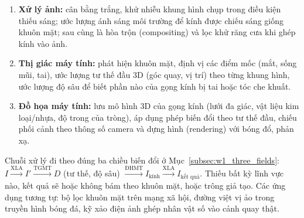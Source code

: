 \begin{enumerate}
    \item \textbf{Xử lý ảnh:} cân bằng trắng, khử nhiễu khung hình chụp trong điều kiện thiếu sáng; ước lượng ánh sáng môi trường để kính được chiếu sáng giống khuôn mặt; sau cùng là hòa trộn (compositing) và lọc khử răng cưa khi ghép kính vào ảnh.
    \item \textbf{Thị giác máy tính:} phát hiện khuôn mặt, định vị các điểm mốc (mắt, sống mũi, tai), ước lượng tư thế đầu 3D (góc quay, vị trí) theo từng khung hình, ước lượng độ sâu để biết phần nào của gọng kính bị tai hoặc tóc che khuất.
    \item \textbf{Đồ họa máy tính:} lưu mô hình 3D của gọng kính (lưới đa giác, vật liệu kim loại/nhựa, độ trong của tròng), áp dụng phép biến đổi theo tư thế đầu, chiếu phối cảnh theo thông số camera và dựng hình (rendering) với bóng đổ, phản xạ.
\end{enumerate}

Chuỗi xử lý đi theo đúng ba chiều biến đổi ở Mục~\ref{subsec:w1_three_fields}: $I \xrightarrow{\text{XLA}} I' \xrightarrow{\text{TGMT}} D$ (tư thế, độ sâu) $\xrightarrow{\text{ĐHMT}} I_{\text{kính}} \xrightarrow{\text{XLA}} I_{\text{kết quả}}$. Thiếu bất kỳ lĩnh vực nào, kết quả sẽ hoặc không bám theo khuôn mặt, hoặc trông giả tạo. Các ứng dụng tương tự: bộ lọc khuôn mặt trên mạng xã hội, đường việt vị ảo trong truyền hình bóng đá, kỹ xảo điện ảnh ghép nhân vật số vào cảnh quay thật.
